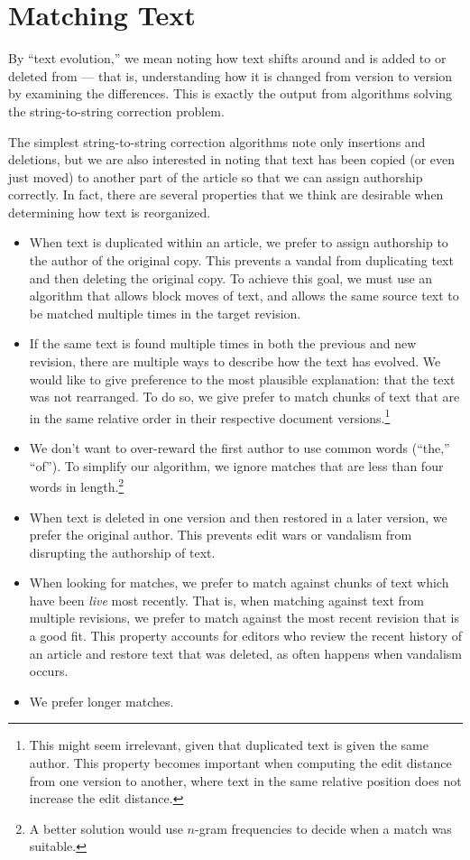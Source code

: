 \section{Matching Text}

By ``text evolution,'' we mean noting how text shifts
around and is added to or deleted from --- that is,
understanding how it is changed from version to version
by examining the differences.
This is exactly the output from algorithms solving the
string-to-string correction problem.

The simplest string-to-string correction algorithms
note only insertions and deletions, but we are also interested
in noting that text has been copied (or even just moved)
to another part of the article so that we can assign authorship
correctly.
In fact, there are several properties that we think are desirable
when determining how text is reorganized.
\begin{itemize}
\item When text is duplicated within an article, we prefer to assign
    authorship to the author of the original copy.
    This prevents a vandal from duplicating text and then deleting the
    original copy.
    To achieve this goal, we must use an algorithm that allows
    block moves of text, and allows the same source text to be
    matched multiple times in the target revision.
\item If the same text is found multiple times in both the previous
    and new revision, there are multiple ways to describe how the
    text has evolved.
    We would like to give preference to the most plausible explanation:
    that the text was not rearranged.
    To do so, we give prefer to match chunks of text that are in the
    same relative order in their respective document
    versions.\footnote{This might seem irrelevant, given that duplicated
    text is given the same author.  This property becomes important
    when computing the edit distance from one version to another,
    where text in the same relative position does not increase the
    edit distance.}
\item We don't want to over-reward the first author to use common
    words (\eg ``the,'' ``of'').
    To simplify our algorithm, we ignore matches that are less than
    four words in length.\footnote{A better solution would use
    $n$-gram frequencies to decide when a match was suitable.}
\item When text is deleted in one version and then restored in a later
    version, we prefer the original author.
    This prevents edit wars or vandalism from disrupting the
    authorship of text.
\item When looking for matches, we prefer to match against chunks
    of text which have been \textit{live} most recently.
    That is, when matching against text from multiple revisions,
    we prefer to match against the most recent revision that is
    a good fit.
    This property accounts for editors who review the recent history
    of an article and restore text that was deleted, as often happens
    when vandalism occurs.
\item We prefer longer matches.
\end{itemize}

